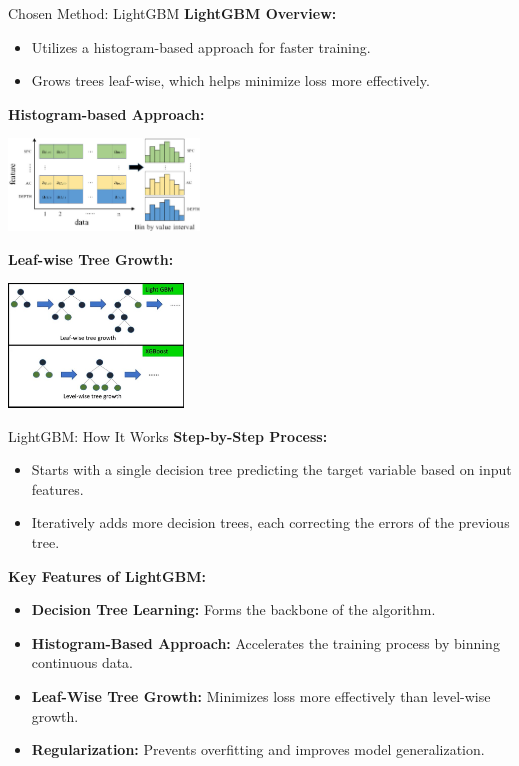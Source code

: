 \documentclass{beamer}\usepackage[]{graphicx}\usepackage[]{xcolor}
\begin{document}
\begin{frame}{Chosen Method: LightGBM}
\textbf{LightGBM Overview:}
\begin{itemize}
    \item Utilizes a histogram-based approach for faster training.
    \item Grows trees leaf-wise, which helps minimize loss more effectively.
\end{itemize}
\vspace{0.02cm} %
\textbf{Histogram-based Approach:}
\begin{center}
    \includegraphics[width=0.38\textwidth]{HistBased.png}
\end{center}
\vspace{-0.2cm} %
\textbf{Leaf-wise Tree Growth:}
\begin{center}
    \includegraphics[width=0.35\textwidth]{Light.jpg}
\end{center}
\end{frame}

\begin{frame}{LightGBM: How It Works}
\textbf{Step-by-Step Process:}
\begin{itemize}
    \item Starts with a single decision tree predicting the target variable based on input features.
    \item Iteratively adds more decision trees, each correcting the errors of the previous tree.
\end{itemize}

\vspace{0.5cm} %

\textbf{Key Features of LightGBM:}
\begin{itemize}
    \item \textbf{Decision Tree Learning:} Forms the backbone of the algorithm.
    \item \textbf{Histogram-Based Approach:} Accelerates the training process by binning continuous data.
    \item \textbf{Leaf-Wise Tree Growth:} Minimizes loss more effectively than level-wise growth.
    \item \textbf{Regularization:} Prevents overfitting and improves model generalization.
\end{itemize}
\end{frame}
\end{document}
